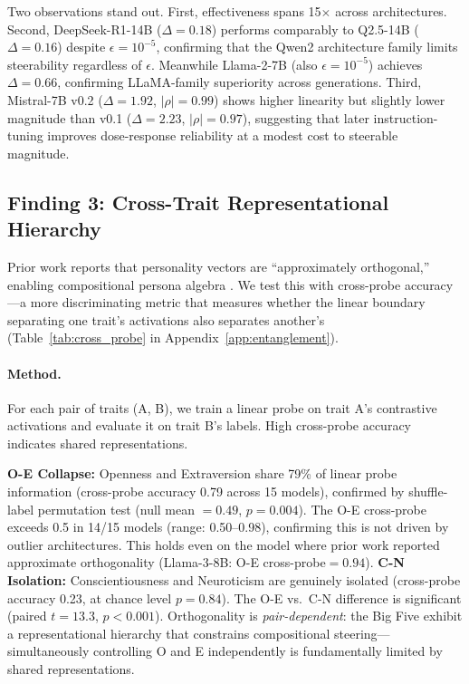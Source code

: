 \documentclass{article}
\begin{document}
Two observations stand out. First, effectiveness spans 15$\times$ across architectures. Second, DeepSeek-R1-14B ($\Delta{=}0.18$) performs comparably to Q2.5-14B ($\Delta{=}0.16$) despite $\epsilon{=}10^{-5}$, confirming that the Qwen2 architecture family limits steerability regardless of $\epsilon$. Meanwhile Llama-2-7B (also $\epsilon{=}10^{-5}$) achieves $\Delta{=}0.66$, confirming LLaMA-family superiority across generations. Third, Mistral-7B v0.2 ($\Delta{=}1.92$, $|\rho|{=}0.99$) shows higher linearity but slightly lower magnitude than v0.1 ($\Delta{=}2.23$, $|\rho|{=}0.97$), suggesting that later instruction-tuning improves dose-response reliability at a modest cost to steerable magnitude.

\subsection{Finding 3: Cross-Trait Representational Hierarchy}\label{sec:oe_collapse}

Prior work reports that personality vectors are ``approximately orthogonal,'' enabling compositional persona algebra \citep{feng2026persona}. We test this with cross-probe accuracy---a more discriminating metric that measures whether the linear boundary separating one trait's activations also separates another's (Table~\ref{tab:cross_probe} in Appendix~\ref{app:entanglement}).

\paragraph{Method.} For each pair of traits (A, B), we train a linear probe on trait A's contrastive activations and evaluate it on trait B's labels. High cross-probe accuracy indicates shared representations.

\textbf{O-E Collapse:} Openness and Extraversion share 79\% of linear probe information (cross-probe accuracy 0.79 across 15 models), confirmed by shuffle-label permutation test (null mean $= 0.49$, $p{=}0.004$). The O-E cross-probe exceeds 0.5 in 14/15 models (range: 0.50--0.98), confirming this is not driven by outlier architectures. This holds even on the model where prior work reported approximate orthogonality (Llama-3-8B: O-E cross-probe${=}0.94$). \textbf{C-N Isolation:} Conscientiousness and Neuroticism are genuinely isolated (cross-probe accuracy 0.23, at chance level $p{=}0.84$). The O-E vs.\ C-N difference is significant (paired $t{=}13.3$, $p{<}0.001$). Orthogonality is \emph{pair-dependent}: the Big Five exhibit a representational hierarchy that constrains compositional steering---simultaneously controlling O and E independently is fundamentally limited by shared representations.
\end{document}
